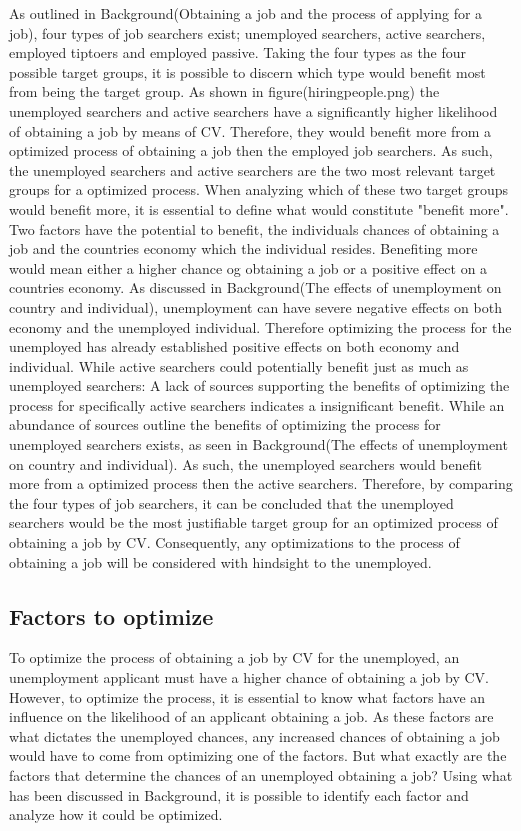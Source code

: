 As outlined in Background(Obtaining a job and the process of applying for a job), four types of job searchers exist; unemployed searchers, active searchers, employed tiptoers and employed passive.
Taking the four types as the four possible target groups, it is possible to discern which type would benefit most from being the target group.
As shown in figure(hiringpeople.png) the unemployed searchers and active searchers have a significantly higher likelihood of obtaining a job by means of CV.
Therefore, they would benefit more from a optimized process of obtaining a job then the employed job searchers.
As such, the unemployed searchers and active searchers are the two most relevant target groups for a optimized process.
When analyzing which of these two target groups would benefit more, it is essential to define what would constitute "benefit more".
Two factors have the potential to benefit, the individuals chances of obtaining a job and the countries economy which the individual resides.
Benefiting more would mean either a higher chance og obtaining a job or a positive effect on a countries economy.
As discussed in Background(The effects of unemployment on country and individual), unemployment can have severe negative effects on both economy and the unemployed individual.
Therefore optimizing the process for the unemployed has already established positive effects on both economy and individual.
While active searchers could potentially benefit just as much as unemployed searchers:
A lack of sources supporting the benefits of optimizing the process for specifically active searchers indicates a insignificant benefit.
While an abundance of sources outline the benefits of optimizing the process for unemployed searchers exists, as seen in Background(The effects of unemployment on country and individual).
As such, the unemployed searchers would benefit more from a optimized process then the active searchers.
Therefore, by comparing the four types of job searchers, it can be concluded that the unemployed searchers would be the most justifiable target group for an optimized process of obtaining a job by CV.
Consequently, any optimizations to the process of obtaining a job will be considered with hindsight to the unemployed. \\
 
\subsection{Factors to optimize}
To optimize the process of obtaining a job by CV for the unemployed, an unemployment applicant must have a higher chance of obtaining a job by CV.
However, to optimize the process, it is essential to know what factors have an influence on the likelihood of an applicant obtaining a job.
As these factors are what dictates the unemployed chances, any increased chances of obtaining a job would have to come from optimizing one of the factors.
But what exactly are the factors that determine the chances of an unemployed obtaining a job?
Using what has been discussed in Background, it is possible to identify each factor and analyze how it could be optimized. \\


